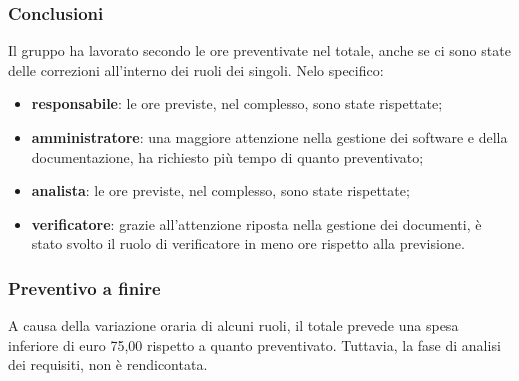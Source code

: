 \subsubsection{Conclusioni}
Il gruppo ha lavorato secondo le ore preventivate nel totale, anche se ci sono state delle correzioni all'interno dei ruoli dei singoli.
Nelo specifico:
\begin{itemize}
	\item {\bfseries responsabile}: le ore previste, nel complesso, sono state rispettate;
	\item {\bfseries amministratore}: una maggiore attenzione nella gestione dei software e della documentazione, ha richiesto più tempo di quanto preventivato;
	\item {\bfseries analista}: le ore previste, nel complesso, sono state rispettate;
	\item {\bfseries verificatore}: grazie all'attenzione riposta nella gestione dei documenti, è stato svolto il ruolo di verificatore in meno ore rispetto alla previsione.\\
	
\end{itemize}

	\subsubsection{Preventivo a finire}
	A causa della variazione oraria di alcuni ruoli, il totale prevede una spesa inferiore di euro 75,00 rispetto a quanto preventivato.
	Tuttavia, la fase di analisi dei requisiti, non è rendicontata.
